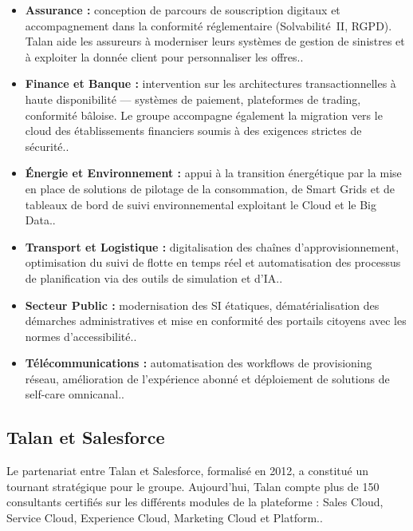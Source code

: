 \begin{itemize}
    \item \textbf{Assurance :} conception de parcours de souscription digitaux et accompagnement dans la conformité réglementaire (Solvabilité~II, RGPD). Talan aide les assureurs à moderniser leurs systèmes de gestion de sinistres et à exploiter la donnée client pour personnaliser les offres.\parencite{URL2}.
    
    \item \textbf{Finance et Banque :} intervention sur les architectures transactionnelles à haute disponibilité --- systèmes de paiement, plateformes de trading, conformité bâloise. Le groupe accompagne également la migration vers le cloud des établissements financiers soumis à des exigences strictes de sécurité.\parencite{URL3}.
    
    \item \textbf{Énergie et Environnement :} appui à la transition énergétique par la mise en place de solutions de pilotage de la consommation, de Smart Grids et de tableaux de bord de suivi environnemental exploitant le Cloud et le Big Data.\parencite{URL4}.
    
    \item \textbf{Transport et Logistique :} digitalisation des chaînes d'approvisionnement, optimisation du suivi de flotte en temps réel et automatisation des processus de planification via des outils de simulation et d'IA.\parencite{URL5}.
    
    \item \textbf{Secteur Public :} modernisation des SI étatiques, dématérialisation des démarches administratives et mise en conformité des portails citoyens avec les normes d'accessibilité.\parencite{URL6}.
    
    \item \textbf{Télécommunications :} automatisation des workflows de provisioning réseau, amélioration de l'expérience abonné et déploiement de solutions de self-care omnicanal.\parencite{URL7}.
\end{itemize}

\subsection{Talan et Salesforce}

Le partenariat entre Talan et Salesforce, formalisé en 2012, a constitué un tournant stratégique pour le groupe. Aujourd'hui, Talan compte plus de 150 consultants certifiés sur les différents modules de la plateforme : Sales Cloud, Service Cloud, Experience Cloud, Marketing Cloud et Platform.\parencite{URL8}.

